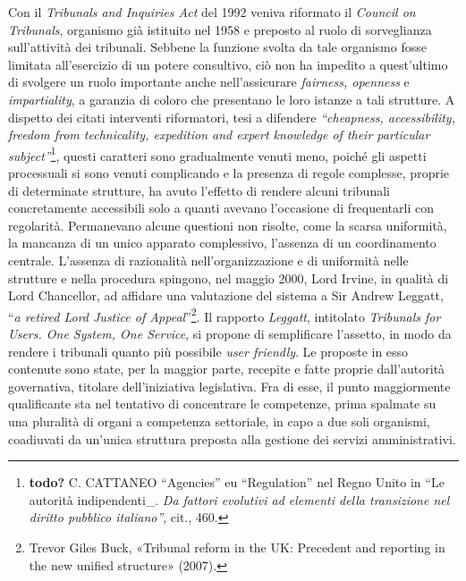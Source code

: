 \documentclass[12pt,it,a4paper,]{report}
\begin{document}
Con il \emph{Tribunals and Inquiries Act} del 1992 veniva riformato il
\emph{Council on Tribunals}, organismo già istituito nel 1958 e preposto
al ruolo di sorveglianza sull'attività dei tribunali. Sebbene la
funzione svolta da tale organismo fosse limitata all'esercizio di un
potere consultivo, ciò non ha impedito a quest'ultimo di svolgere un
ruolo importante anche nell'assicurare \emph{fairness, openness} e
\emph{impartiality}, a garanzia di coloro che presentano le loro istanze
a tali strutture. A dispetto dei citati interventi riformatori, tesi a
difendere \emph{``cheapness, accessibility, freedom from technicality,
expedition and expert knowledge of their particular
subject''}\footnote{\textbf{todo?} C. CATTANEO ``Agencies'' eu
  ``Regulation'' nel Regno Unito in ``Le autorità indipendenti\_.
  \emph{Da fattori evolutivi ad elementi della transizione nel diritto
  pubblico italiano''}, cit., 460.}, questi caratteri sono gradualmente
venuti meno, poiché gli aspetti processuali si sono venuti complicando e
la presenza di regole complesse, proprie di determinate strutture, ha
avuto l'effetto di rendere alcuni tribunali concretamente accessibili
solo a quanti avevano l'occasione di frequentarli con regolarità.
Permanevano alcune questioni non risolte, come la scarsa uniformità, la
mancanza di un unico apparato complessivo, l'assenza di un coordinamento
centrale. L'assenza di razionalità nell'organizzazione e di uniformità
nelle strutture e nella procedura spingono, nel maggio 2000, Lord
Irvine, in qualità di Lord Chancellor, ad affidare una valutazione del
sistema a Sir Andrew Leggatt, ``\emph{a retired Lord Justice of
Appeal}''\footnote{{Trevor Giles Buck, {«Tribunal reform in the UK:
  Precedent and reporting in the new unified structure»} (2007).}}. Il
rapporto \emph{Leggatt}, intitolato \emph{Tribunals for Users. One
System, One Service}, si propone di semplificare l'assetto, in modo da
rendere i tribunali quanto più possibile \emph{user friendly}. Le
proposte in esso contenute sono state, per la maggior parte, recepite e
fatte proprie dall'autorità governativa, titolare dell'iniziativa
legislativa. Fra di esse, il punto maggiormente qualificante sta nel
tentativo di concentrare le competenze, prima spalmate su una pluralità
di organi a competenza settoriale, in capo a due soli organismi,
coadiuvati da un'unica struttura preposta alla gestione dei servizi
amministrativi.
\end{document}
